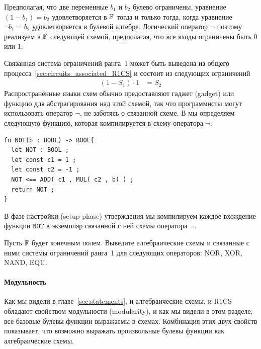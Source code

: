 Предполагая, что две переменные $b_1$ и $b_2$ булево ограничены, уравнение $(1-b_1) = b_2$ удовлетворяется в $\mathbb{F}$ тогда и только тогда, когда уравнение $\lnot b_1 = b_2$ удовлетворяется в булевой алгебре. Логический оператор $\lnot$ поэтому реализуем в $\mathbb{F}$ следующей схемой, предполагая, что все входы ограничены быть $0$ или $1$:
\begin{center}
\end{center}
Связанная система ограничений ранга~1 может быть выведена из общего процесса~\ref{sec:circuits_associated_R1CS} и состоит из следующих ограничений
\begin{align*}
  (1-S_1)\cdot 1 &= S_2
\end{align*}
Распространённые языки схем обычно предоставляют гаджет (gadget) или функцию для абстрагирования над этой схемой, так что программисты могут использовать оператор $\lnot$, не заботясь о связанной схеме. В  мы определяем следующую функцию, которая компилируется в схему оператора $\lnot$:
\begin{lstlisting}
fn NOT(b : BOOL) -> BOOL{
  let NOT : BOOL ;
  let const c1 = 1 ;
  let const c2 = -1 ;
  NOT <== ADD( c1 , MUL( c2 , b) ) ;
  return NOT ;
}
\end{lstlisting}
В фазе настройки (setup phase) утверждения мы компилируем каждое вхождение функции $\mathtt{NOT}$ в экземпляр связанной с ней схемы оператора $\lnot$.
\begin{exercise}
Пусть $\mathbb{F}$ будет конечным полем. Выведите алгебраические схемы и связанные с ними системы ограничений ранга~1 для следующих операторов: NOR, XOR, NAND, EQU.
\end{exercise}
\paragraph{Модульность} Как мы видели в главе~\ref{sec:statements}, и алгебраические схемы, и R1CS обладают свойством модульности (modularity), и как мы видели в этом разделе, все базовые булевы функции выражаемы в схемах. Комбинация этих двух свойств показывает, что возможно выражать произвольные булевы функции как алгебраические схемы.

